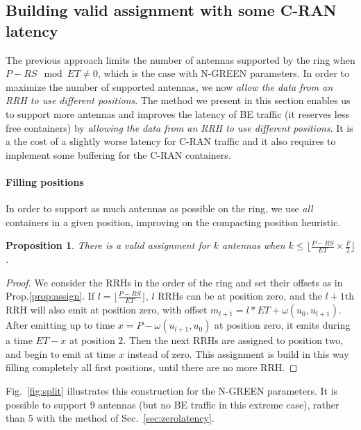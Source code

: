 \documentclass[10pt, conference, letterpaper]{IEEEtran}
\newtheorem{prop}{Proposition}
\begin{document}
\subsection{Building valid assignment with some C-RAN latency}
\label{sec:maxant}

The previous approach limits the number of antennas supported by the ring when $P-RS \mod ET \neq 0$, which is the case with N-GREEN parameters. In order to maximize the number of supported antennas, we now \emph{allow the data from an RRH to use different positions}. The method we present in this section enables us to support more antennas and improves the latency of BE traffic (it reserves less free containers) by \emph{allowing the data from an RRH to use different positions}.
It is a the cost of a slightly worse latency for C-RAN traffic and it also requires to implement some buffering for the C-RAN containers. 



\paragraph{Filling positions}

In order to support as much antennas as possible on the ring, we use \emph{all} containers in a given position, improving on the compacting position heuristic. 

\begin{prop}
 There is a valid assignment for $k$ antennas when $k \leq \lfloor \frac{P- RS}{ET} \times \frac{F}{2}\rfloor$.
\end{prop}
\begin{proof}
 We consider the RRHs in the order of the ring and set their offsets as in Prop.\ref{prop:assign}.
 If $l = \lfloor \frac{P- RS}{ET}\rfloor$, $l$ RRHs can be at position zero, and the $l+1$th
 RRH will also emit at position zero, with offset $m_{l+1} = l*ET + \omega(u_0,u_{l+1})$. 
 After emitting up to time $x = P - \omega(u_{l+1},u_{0})$ at position zero, it emits during a time $ET -x $  at position $2$. Then the next RRHs are assigned to position two, and begin to emit at time $x$ instead of zero. This assignment is build in this way filling completely all first positions, until there are no more RRH.  
\end{proof}

Fig.~\ref{fig:split} illustrates this construction for the N-GREEN parameters. 
It is possible to support $9$ antennas (but no BE traffic in this extreme case),
rather than $5$ with the method of Sec.~\ref{sec:zerolatency}.
\end{document}
